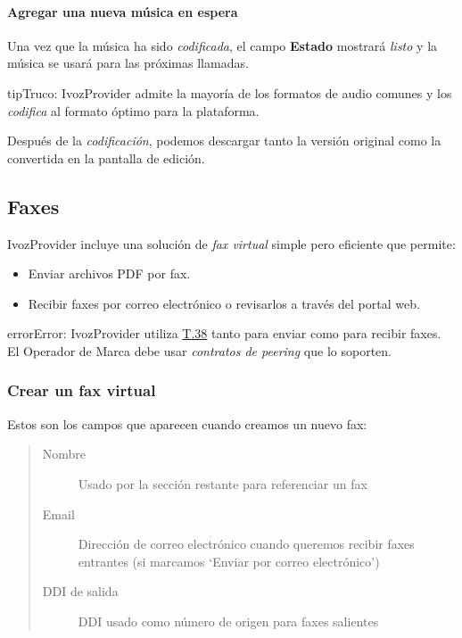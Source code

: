 \documentclass[letterpaper,10pt,spanish]{sphinxmanual}
\begin{document}
\paragraph{Agregar una nueva música en espera}

Una vez que la música ha sido \emph{codificada}, el campo \textbf{Estado} mostrará \emph{listo} y la música se usará para las próximas llamadas.

\begin{notice}{tip}{Truco:}
IvozProvider admite la mayoría de los formatos de audio comunes y los \emph{codifica} al formato óptimo para la plataforma.
\end{notice}

Después de la \emph{codificación}, podemos descargar tanto la versión original como la convertida en la pantalla de edición.
\label{administration_portal/client/vpbx/faxes:faxing-system}

\subsection{Faxes}
\label{administration_portal/client/vpbx/faxes:faxes}\label{administration_portal/client/vpbx/faxes::doc}\label{administration_portal/client/vpbx/faxes:faxing-system}\label{administration_portal/client/vpbx/faxes:id1}
IvozProvider incluye una solución de \emph{fax virtual} simple pero eficiente que permite:
\begin{itemize}
\item {} 
Enviar archivos PDF por fax.

\item {} 
Recibir faxes por correo electrónico o revisarlos a través del portal web.

\end{itemize}

\begin{notice}{error}{Error:}
IvozProvider utiliza \href{http://www.voip-info.org/wiki/view/T.38}{T.38} tanto para enviar como para recibir faxes. El Operador de Marca debe usar \emph{contratos de peering} que lo soporten.
\end{notice}


\subsubsection{Crear un fax virtual}
\label{administration_portal/client/vpbx/faxes:creating-a-virtual-fax}
Estos son los campos que aparecen cuando creamos un nuevo fax:
\begin{quote}
\begin{description}
\item[{Nombre}] \leavevmode
Usado por la sección restante para referenciar un fax

\item[{Email}] \leavevmode
Dirección de correo electrónico cuando queremos recibir faxes entrantes (si marcamos `Enviar por correo electrónico')

\item[{DDI de salida}] \leavevmode
DDI usado como número de origen para faxes salientes

\end{description}
\end{quote}
\end{document}
